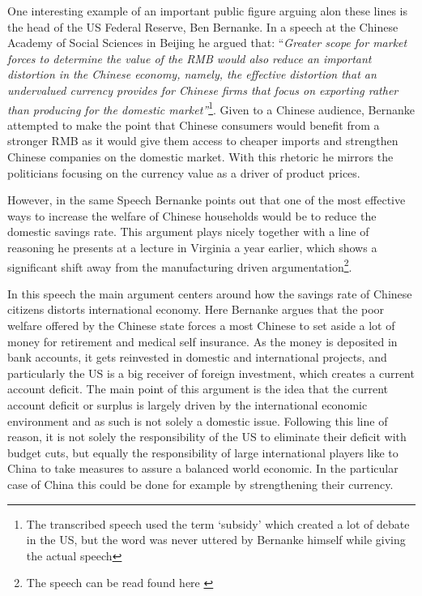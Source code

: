 One interesting example of an important public figure arguing alon these lines is the head of the US 
Federal Reserve, Ben Bernanke. In a speech at the Chinese Academy of Social 
Sciences in Beijing he argued that: ``\textit{Greater scope for market 
	forces to determine the value of the RMB would also reduce an 
	important distortion in the Chinese economy, namely, the effective 
	distortion that an undervalued currency provides for Chinese firms 
	that focus on exporting rather than producing for the domestic 
market''}\footnote{The transcribed speech \cite{Bernanke06} used the 
term `subsidy' which created a lot of debate in the US, but the word was 
never uttered by Bernanke himself while giving the actual 
speech\cite{reuters06}}. Given to a Chinese audience, Bernanke attempted 
to make the point that Chinese consumers would benefit from a stronger 
RMB as it would give them access to cheaper imports and strengthen 
Chinese companies on the domestic market. With this rhetoric he mirrors 
the politicians focusing on the currency value as a driver of product 
prices.

However, in the same Speech Bernanke points out that one of the most 
effective ways to increase the welfare of Chinese households would be to 
reduce the domestic savings rate. This argument plays nicely together 
with a line of reasoning he presents at a lecture in Virginia a year 
earlier, which shows a significant shift away from the manufacturing 
driven argumentation\footnote{The speech can be read found here 
\cite{Bernanke05}}.

In this speech the main argument centers around how the savings rate 
of Chinese citizens distorts international economy. Here Bernanke argues 
that the poor welfare offered by the Chinese state forces a most Chinese 
to set aside a lot of money for retirement and medical self insurance.  
As the money is deposited in bank accounts, it gets reinvested in 
domestic and international projects, and particularly the US is a big 
receiver of foreign investment, which creates a current account deficit.  
The main point of this argument is the idea that the current account 
deficit or surplus is largely driven by the international economic 
environment and as such is not solely a domestic issue. Following this 
line of reason, it is not solely the responsibility of the US to 
eliminate their deficit with budget cuts, but equally the responsibility 
of large international players like to China to take measures to assure 
a balanced world economic. In the particular case of China this could be 
done for example by strengthening their currency.

